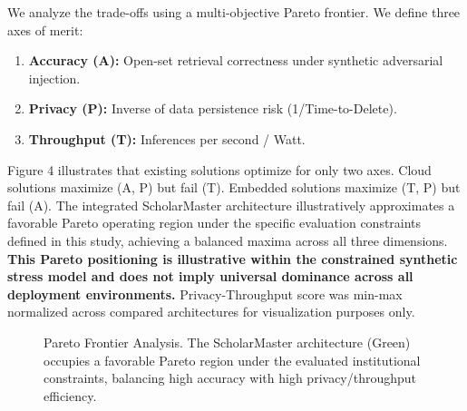 \documentclass[conference]{IEEEtran}
\begin{document}
We analyze the trade-offs using a multi-objective Pareto frontier. We define three axes of merit:
\begin{enumerate}
    \item \textbf{Accuracy (A):} Open-set retrieval correctness under synthetic adversarial injection.
    \item \textbf{Privacy (P):} Inverse of data persistence risk (1/Time-to-Delete).
    \item \textbf{Throughput (T):} Inferences per second / Watt.
\end{enumerate}

Figure 4 illustrates that existing solutions optimize for only two axes. Cloud solutions maximize (A, P) but fail (T). Embedded solutions maximize (T, P) but fail (A). The integrated ScholarMaster architecture illustratively approximates a favorable Pareto operating region under the specific evaluation constraints defined in this study, achieving a balanced maxima across all three dimensions. \textbf{This Pareto positioning is illustrative within the constrained synthetic stress model and does not imply universal dominance across all deployment environments.} Privacy-Throughput score was min-max normalized across compared architectures for visualization purposes only.

\begin{figure}[htbp]
\centering
{}
\caption{Pareto Frontier Analysis. The ScholarMaster architecture (Green) occupies a favorable Pareto region under the evaluated institutional constraints, balancing high accuracy with high privacy/throughput efficiency.}
\label{fig:pareto}
\end{figure}
\end{document}

